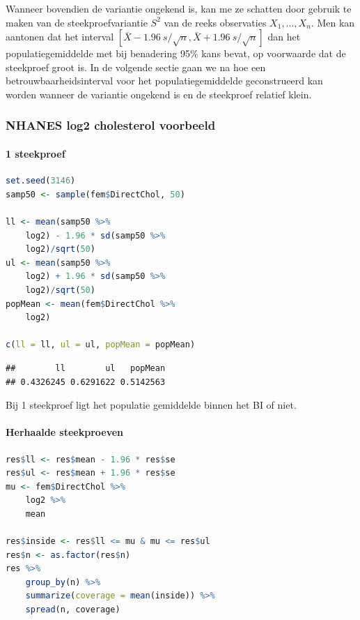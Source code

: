 \documentclass[
  12pt,dutch,coursenotes]{book}
\theoremstyle{definition}
\theoremstyle{definition}
\theoremstyle{definition}
\theoremstyle{definition}
\theoremstyle{remark}
\begin{document}
Wanneer bovendien de variantie ongekend is, kan me ze schatten door gebruik te maken van de
steekproefvariantie \(S^2\) van de reeks observaties \(X_1,...,X_n\). Men kan aantonen dat
het interval \([\bar{X} - 1.96 \ s/\sqrt{n} , \bar{X} + 1.96 \ s/\sqrt{n} ]\)
dan het populatiegemiddelde met bij benadering 95\% kans bevat, op voorwaarde
dat de steekproef groot is. In de volgende sectie gaan we na hoe een
betrouwbaarheidsinterval voor het populatiegemiddelde geconstrueerd kan
worden wanneer de variantie ongekend is en de steekproef relatief klein.

\hypertarget{nhanes-log2-cholesterol-voorbeeld}{%
\subsubsection{NHANES log2 cholesterol voorbeeld}\label{nhanes-log2-cholesterol-voorbeeld}}

\hypertarget{steekproef-1}{%
\paragraph{1 steekproef}\label{steekproef-1}}

\begin{lstlisting}[language=R]
set.seed(3146)
samp50 <- sample(fem$DirectChol, 50)

ll <- mean(samp50 %>%
    log2) - 1.96 * sd(samp50 %>%
    log2)/sqrt(50)
ul <- mean(samp50 %>%
    log2) + 1.96 * sd(samp50 %>%
    log2)/sqrt(50)
popMean <- mean(fem$DirectChol %>%
    log2)

c(ll = ll, ul = ul, popMean = popMean)
\end{lstlisting}

\begin{lstlisting}
##        ll        ul   popMean 
## 0.4326245 0.6291622 0.5142563
\end{lstlisting}

Bij 1 steekproef ligt het populatie gemiddelde binnen het BI of niet.

\hypertarget{herhaalde-steekproeven}{%
\paragraph{Herhaalde steekproeven}\label{herhaalde-steekproeven}}

\begin{lstlisting}[language=R]
res$ll <- res$mean - 1.96 * res$se
res$ul <- res$mean + 1.96 * res$se
mu <- fem$DirectChol %>%
    log2 %>%
    mean

res$inside <- res$ll <= mu & mu <= res$ul
res$n <- as.factor(res$n)
res %>%
    group_by(n) %>%
    summarize(coverage = mean(inside)) %>%
    spread(n, coverage)
\end{lstlisting}
\end{document}
